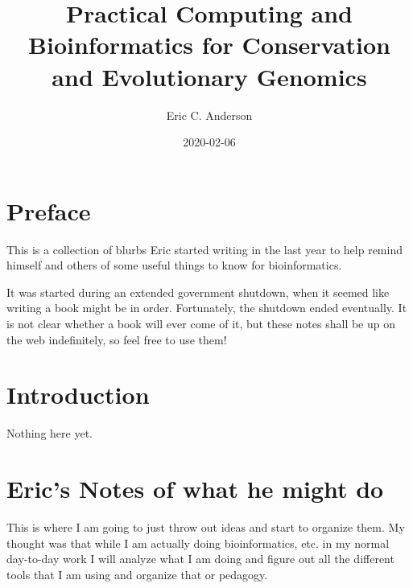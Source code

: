 \documentclass[]{krantz}
\title{Practical Computing and Bioinformatics for Conservation and Evolutionary Genomics}
\author{Eric C. Anderson}
\date{2020-02-06}
\begin{document}
\maketitle


\thispagestyle{empty}

\begin{center}

\end{center}

\setlength{\abovedisplayskip}{-5pt}
\setlength{\abovedisplayshortskip}{-5pt}

{
\hypersetup{linkcolor=}
\setcounter{tocdepth}{2}
\tableofcontents
}
\listoftables
\listoffigures
\hypertarget{preface}{%
\chapter*{Preface}\label{preface}}


This is a collection of blurbs Eric started writing in the last year to
help remind himself and others of some useful things to know for bioinformatics.

It was started during an extended government shutdown, when it seemed like writing a book
might be in order. Fortunately, the shutdown ended eventually. It is not clear whether a
book will ever come of it, but these notes shall be up on the web indefinitely, so feel free to use
them!

\hypertarget{intro}{%
\chapter{Introduction}\label{intro}}

Nothing here yet.

\hypertarget{erics-notes-of-what-he-might-do}{%
\chapter{Eric's Notes of what he might do}\label{erics-notes-of-what-he-might-do}}

This is where I am going to just throw out ideas and start to organize them. My thought
was that while I am actually doing bioinformatics, etc. in my normal day-to-day work
I will analyze what I am doing and figure out all the different tools that I am using
and organize that or pedagogy.
\end{document}
